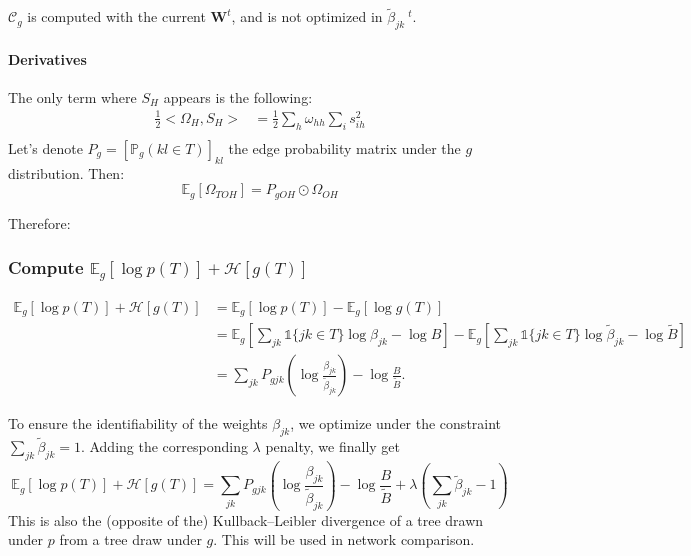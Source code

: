 \documentclass[11pt,a4paper]{article}
\newcommand*\widefbox[1]{\fbox{\hspace{3em}#1\hspace{3em}}}
\newcommand{\Esp}{\mathds{E}}
\newcommand{\entr}{\mathcal{H}}
\begin{document}
$\mathcal{C}_g$ is computed with the current $\bm{W}^t$, and is not optimized in $\widetilde{\beta}_{jk}\:^t$.
\paragraph{Derivatives\\}
The only term where $S_H$ appears is the following:
\begin{align*}
\frac{1}{2}<\Omega_H, S_H> &= \frac{1}{2} \sum_h \omega_{hh}\sum_i s_{ih}^2\\
\end{align*}
Let's denote $P_g = [\mathds{P}_g(kl \in T)]_{kl}$ the edge probability matrix under the $g$ distribution. Then:
$$\Esp_g[\Omega_{TOH}] = P_{gOH} \odot \Omega_{OH}$$

Therefore:

\subsubsection{Compute $\Esp_g[\log p(T)] + \entr[g(T)]$}

\begin{align*}
\Esp_g[\log p(T)] + \entr[g(T)]&=\Esp_g[\log p(T)] -\Esp_g[\log g(T)]\\
&=\Esp_g - \Esp_g\\
&= \sum_{jk}P_{gjk} \left(\log {}\right) - \log {} 
.\end{align*}

To ensure the identifiability of the weights $\beta_{jk}$, we optimize under the constraint $\sum_{jk} \widetilde{\beta}_{jk} =1 $. Adding the corresponding $\lambda$ penalty, we finally get 
$$\Esp_g[\log p(T)] + \entr[g(T)]=\sum_{jk}P_{gjk} \left(\log \frac{\beta_{jk}}{\widetilde{\beta}_{jk}}\right) - \log \frac{B}{\widetilde{B}}  + \lambda(\sum_{jk} \widetilde{\beta}_{jk} -1 )$$
This is also the (opposite of the) Kullback–Leibler divergence of a tree drawn under $p$ from a tree draw under $g$. This will be used in network comparison.
\end{document}
